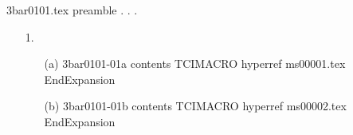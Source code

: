 3bar0101.tex preamble
.
.
.
\begin{enumerate}
\item[ 1.]
\begin{enumerate}
3bar0101-01 contents
\item[(a)]
3bar0101-01a contents
TCIMACRO
hyperref ms00001.tex
EndExpansion
\item[(b)]
3bar0101-01b contents
TCIMACRO
hyperref ms00002.tex
EndExpansion
\end{enumerate}
\end{enumerate}
